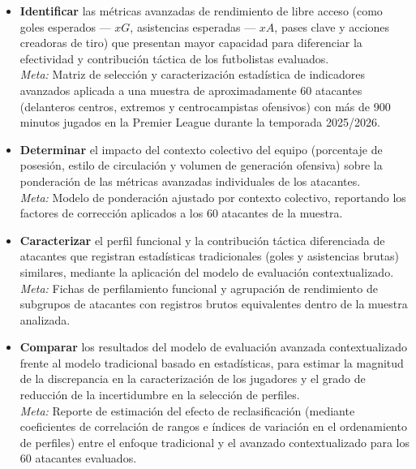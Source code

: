 \begin{itemize}
    \item[\textbf{a)}] \textbf{Identificar} las métricas avanzadas de rendimiento de libre acceso (como goles esperados --- $xG$, asistencias esperadas --- $xA$, pases clave y acciones creadoras de tiro) que presentan mayor capacidad para diferenciar la efectividad y contribución táctica de los futbolistas evaluados.\\
    \textit{Meta:} Matriz de selección y caracterización estadística de indicadores avanzados aplicada a una muestra de aproximadamente 60 atacantes (delanteros centros, extremos y centrocampistas ofensivos) con más de 900 minutos jugados en la Premier League durante la temporada 2025/2026.

    \item[\textbf{b)}] \textbf{Determinar} el impacto del contexto colectivo del equipo (porcentaje de posesión, estilo de circulación y volumen de generación ofensiva) sobre la ponderación de las métricas avanzadas individuales de los atacantes.\\
    \textit{Meta:} Modelo de ponderación ajustado por contexto colectivo, reportando los factores de corrección aplicados a los 60 atacantes de la muestra.

    \item[\textbf{c)}] \textbf{Caracterizar} el perfil funcional y la contribución táctica diferenciada de atacantes que registran estadísticas tradicionales (goles y asistencias brutas) similares, mediante la aplicación del modelo de evaluación contextualizado.\\
    \textit{Meta:} Fichas de perfilamiento funcional y agrupación de rendimiento de subgrupos de atacantes con registros brutos equivalentes dentro de la muestra analizada.

    \item[\textbf{d)}] \textbf{Comparar} los resultados del modelo de evaluación avanzada contextualizado frente al modelo tradicional basado en estadísticas, para estimar la magnitud de la discrepancia en la caracterización de los jugadores y el grado de reducción de la incertidumbre en la selección de perfiles.\\
    \textit{Meta:} Reporte de estimación del efecto de reclasificación (mediante coeficientes de correlación de rangos e índices de variación en el ordenamiento de perfiles) entre el enfoque tradicional y el avanzado contextualizado para los 60 atacantes evaluados.
\end{itemize}